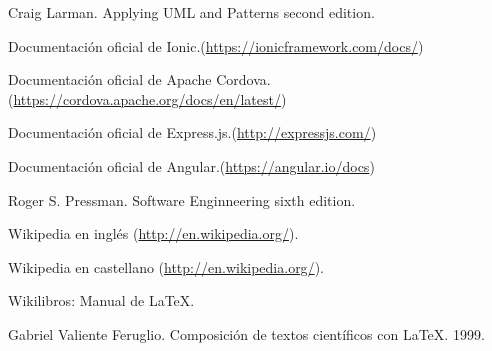 \begin{thebibliography}{99}

 Craig Larman. Applying UML and Patterns second edition.

 Documentación oficial de Ionic.(\href{https://ionicframework.com/docs/}{https://ionicframework.com/docs/})

 Documentación oficial de Apache Cordova.(\href{https://cordova.apache.org/docs/en/latest/}{https://cordova.apache.org/docs/en/latest/})

 Documentación oficial de Express.js.(\href{http://expressjs.com/}{http://expressjs.com/})

 Documentación oficial de Angular.(\href{https://angular.io/docs}{https://angular.io/docs})

 Roger S. Pressman. Software Enginneering sixth edition.

 Wikipedia en inglés (\href{http://en.wikipedia.org/}{http://en.wikipedia.org/}).

 Wikipedia en castellano (\href{http://es.wikipedia.org/}{http://en.wikipedia.org/}).

 Wikilibros: Manual de \LaTeX.

 Gabriel Valiente Feruglio. Composición de textos científicos con \LaTeX. 1999.

\end{thebibliography}
